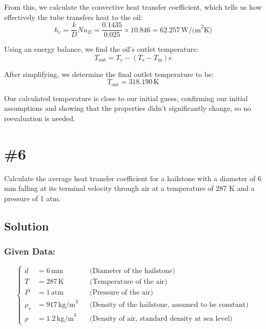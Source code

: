 \documentclass{article}
\numberwithin{equation}{section}
\begin{document}
From this, we calculate the convective heat transfer coefficient, which tells us how effectively the tube transfers heat to the oil:
\begin{equation}
    h_{c} = \frac{k}{D} Nu_{D} = \frac{0.1435}{0.025} \times 10.846 = 62.257 \, \text{W/(m}^2 \text{K)}
\end{equation}

Using an energy balance, we find the oil's outlet temperature:
\begin{equation}
    T_{\text{out}} = T_{s} - (T_{s} - T_{\text{in}})e
\end{equation}

After simplifying, we determine the final outlet temperature to be:
\begin{equation}
    T_{\text{out}} = 318.190 \, \text{K}
\end{equation}

Our calculated temperature is close to our initial guess, confirming our initial assumptions and showing that the properties didn't significantly change, so no reevaluation is needed.


\newpage
\section{\#6}
Calculate the average heat transfer coefficient for a hailstone with a diameter of 6 mm falling at its terminal velocity through air at a temperature of 287 K and a pressure of 1 atm.

\subsection*{Solution}
\subsubsection*{Given Data:}
\begin{equation}
\left\{
\begin{aligned}
    d &= 6 \, \text{mm} && \text{(Diameter of the hailstone)} \\
    T &= 287 \, \text{K} && \text{(Temperature of the air)} \\
    P &= 1 \, \text{atm} && \text{(Pressure of the air)} \\
    \rho_s &= 917 \, \text{kg/m}^3 && \text{(Density of the hailstone, assumed to be constant)} \\
    \rho &= 1.2 \, \text{kg/m}^3 && \text{(Density of air, standard density at sea level)}
\end{aligned}
\right.
\end{equation}
\end{document}

